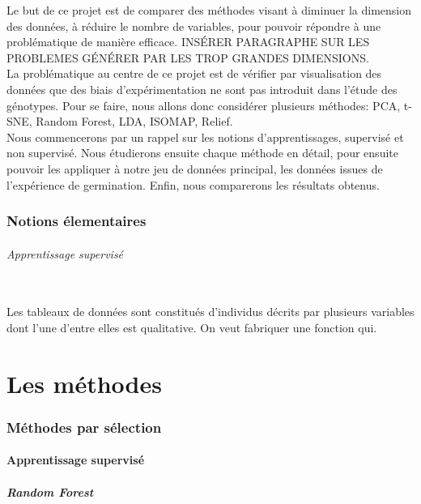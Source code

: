 \documentclass[12pt]{article}
\begin{document}
Le but de ce projet est de comparer des méthodes visant à diminuer la dimension des données, à réduire le nombre de variables, pour pouvoir répondre à une problématique de manière efficace. INSÉRER PARAGRAPHE SUR LES PROBLEMES GÉNÉRER PAR LES TROP GRANDES DIMENSIONS. \\

La problématique au centre de ce projet est de vérifier par visualisation des données que des biais d'expérimentation ne sont pas introduit dans l'étude des génotypes. 
Pour se faire, nous allons donc considérer plusieurs méthodes:  PCA, t-SNE, Random Forest, LDA, ISOMAP, Relief. \\

Nous commencerons par un rappel sur les notions d'apprentissages, supervisé et non supervisé.
Nous étudierons ensuite chaque méthode en détail, pour ensuite pouvoir les appliquer à notre jeu de données principal, les données issues de l'expérience de germination.
Enfin, nous comparerons les résultats obtenus.

\section*{Notions élementaires}

\paragraph{Apprentissage supervisé}\mbox{}\\

Les tableaux de données sont constitués d'individus décrits par plusieurs variables dont l'une d'entre elles est qualitative. On veut fabriquer une fonction qui.


\newpage
\part{Les méthodes}

\section{Méthodes par sélection}


\subsection{Apprentissage supervisé}

\subsubsection{Random Forest}
\end{document}
